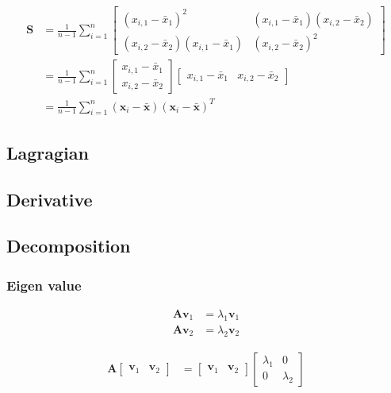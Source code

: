 \documentclass{article}
\begin{document}
\begin{align}
	\mathbf{S} & =\frac{1}{n-1}\sum_{i=1}^{n}\left[\begin{array}{cc}
		\left(x_{i,1}-\bar{x}_{1}\right)^{2} & \left(x_{i,1}-\bar{x}_{1}\right)\left(x_{i,2}-\bar{x}_{2}\right)\\
		\left(x_{i,2}-\bar{x}_{2}\right)\left(x_{i,1}-\bar{x}_{1}\right) & \left(x_{i,2}-\bar{x}_{2}\right)^{2}
	\end{array}\right]\\
	& =\frac{1}{n-1}\sum_{i=1}^{n}\left[\begin{array}{c}
		x_{i,1}-\bar{x}_{1}\\
		x_{i,2}-\bar{x}_{2}
	\end{array}\right]\left[\begin{array}{cc}
		x_{i,1}-\bar{x}_{1} & x_{i,2}-\bar{x}_{2}\end{array}\right]\\
	& =\frac{1}{n-1}\sum_{i=1}^{n}\left(\mathbf{x}_{i}-\bar{\mathbf{x}}\right)\left(\mathbf{x}_{i}-\bar{\mathbf{x}}\right)^{T}
\end{align}

\subsection{Lagragian}

\subsection{Derivative}

\subsection{Decomposition}

\subsubsection{Eigen value}

\begin{align}
	\mathbf{A}\mathbf{v}_{1} & =\lambda_{1}\mathbf{v}_{1}\\
	\mathbf{A}\mathbf{v}_{2} & =\lambda_{2}\mathbf{v}_{2}
\end{align}

\begin{align}
	\mathbf{A}\left[\begin{array}{cc}
		\mathbf{v}_{1} & \mathbf{v}_{2}\end{array}\right] & =\left[\begin{array}{cc}
		\mathbf{v}_{1} & \mathbf{v}_{2}\end{array}\right]\left[\begin{array}{cc}
		\lambda_{1} & 0\\
		0 & \lambda_{2}
	\end{array}\right]
\end{align}
\end{document}
